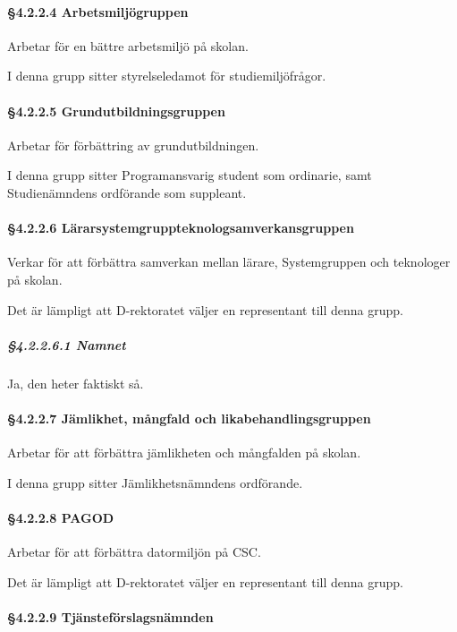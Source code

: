 \paragraph{§4.2.2.4 Arbetsmiljögruppen}

Arbetar för en bättre arbetsmiljö på skolan.

I denna grupp sitter styrelseledamot för studiemiljöfrågor.

\paragraph{§4.2.2.5 Grundutbildningsgruppen}

Arbetar för förbättring av grundutbildningen.

I denna grupp sitter Programansvarig student som ordinarie, samt Studienämndens ordförande som suppleant.

\paragraph{§4.2.2.6 Lärarsystemgruppteknologsamverkansgruppen}

Verkar för att förbättra samverkan mellan lärare, Systemgruppen och teknologer på skolan.

Det är lämpligt att D-rektoratet väljer en representant till denna grupp.

\subparagraph{§4.2.2.6.1 Namnet}

Ja, den heter faktiskt så.

\paragraph{§4.2.2.7 Jämlikhet, mångfald och likabehandlingsgruppen}

Arbetar för att förbättra jämlikheten och mångfalden på skolan.

I denna grupp sitter Jämlikhetsnämndens ordförande.

\paragraph{§4.2.2.8 PAGOD}

Arbetar för att förbättra datormiljön på CSC.

Det är lämpligt att D-rektoratet väljer en representant till denna grupp.

\paragraph{§4.2.2.9 Tjänsteförslagsnämnden}

